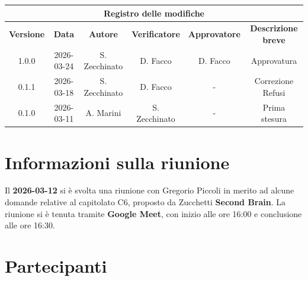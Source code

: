 \documentclass[a4paper, 10pt, colorlinks=true, linkcolor=black, urlcolor=blue, citecolor=blue, hidelinks]{article}
\begin{document}
\newcommand{\tipoverbale}{esterno}
\newcommand{\dataverbale}{2026-03-12}
\newcommand{\dataversione}{2026-03-24}
\newcommand{\versione}{1.0.0}
\newcommand{\stato}{Approvato}
\newcommand{\destinatari}{The Bitless, prof. T. Vardanega, prof. R. Cardin, Zucchetti}




\newpage

\begin{center}
    \thispagestyle{empty}
    \begin{tabular}{|c|c|c|c|c|c|}
                    \hline
                    \multicolumn{6}{|c|}{\textbf{Registro delle modifiche}} \\
                    \hline
                    \textbf{Versione} & \textbf{Data} & \textbf{Autore}  & \textbf{Verificatore} & \textbf{Approvatore} & \textbf{Descrizione breve} \\
                    \hline
                    \versione & \dataversione & S. Zecchinato & D. Facco & D. Facco & Approvatura \\
                    \hline 
                    0.1.1 & 2026-03-18 & S. Zecchinato & D. Facco & - & Correzione Refusi \\
                    \hline
                    0.1.0 & 2026-03-11 & A. Marini &  S. Zecchinato  & - & Prima stesura \\
                    \hline
                \end{tabular}
\end{center}

\newpage

\tableofcontents


\newpage
\section{Informazioni sulla riunione}
Il \textbf{2026-03-12} si è svolta una riunione con Gregorio Piccoli in merito ad alcune domande relative al capitolato C6, proposto da Zucchetti \textbf{Second Brain}. La riunione si è tenuta tramite \textbf{Google Meet}, con inizio alle ore 16:00 e conclusione alle ore 16:30.

\section{Partecipanti}
\end{document}
